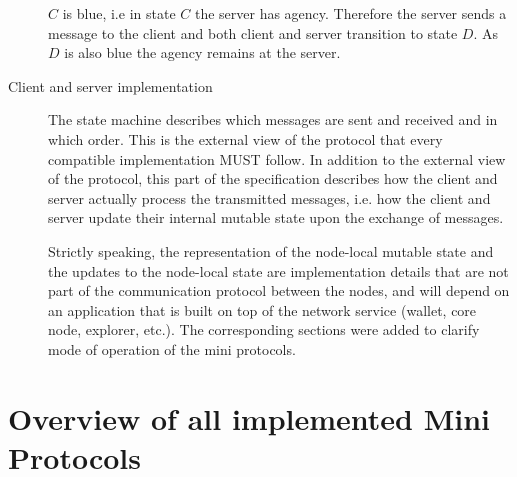 \documentclass{report}
\newcommand{\hsref}[1]{}
\newcommand{\hsref}[1]
                    {\href{https://github.com/input-output-hk/ouroboros-network/blob/master/#1}
                      {\emph{Haskell source: #1}}}
\theoremstyle{definition}{
  \newtheorem{lemma}{Lemma}[section] %
  \newtheorem{definition}[lemma]{Definition}
}
\theoremstyle{theorem}{
  \newtheorem{invariant}[lemma]{Invariant}
  \newtheorem{proofobligation}[lemma]{Proof Obligation}
}
\numberwithin{equation}{lemma}
\begin{document}
\begin{description}
      $C$ is blue, i.e in state $C$ the server has agency.
      Therefore the server sends a message to the client and
      both client and server transition to state $D$.
      As $D$ is also blue the agency remains at the server.

\item[Client and server implementation]
  The state machine describes which messages are sent and received and in which order.
  This is the external view of the protocol that every compatible implementation MUST follow.
  In addition to the external view of the protocol, this part of the specification describes
  how the client and server actually process the transmitted messages,
  i.e. how the client and server update their internal mutable state
  upon the exchange of messages.

  Strictly speaking, the representation of the node-local mutable state
  and the updates to the node-local state are implementation details that are
  not part of the communication protocol between the nodes,  and will
  depend on an application that is built on top of the network service
  (wallet, core node, explorer, etc.).
  The corresponding sections were added to clarify mode of operation of the
  mini protocols.

\end{description}
\section{Overview of all implemented Mini Protocols}

\newcommand{\miniEntry}[4]{
    \hline
    #1 & Section \ref{#2} \\
    \multicolumn{2}{|l|} {#3} \\
    \multicolumn{2}{|l|} {\hsref{#4}}\\ \hline
    \multicolumn{2}{l} {} \\
}
\end{document}
